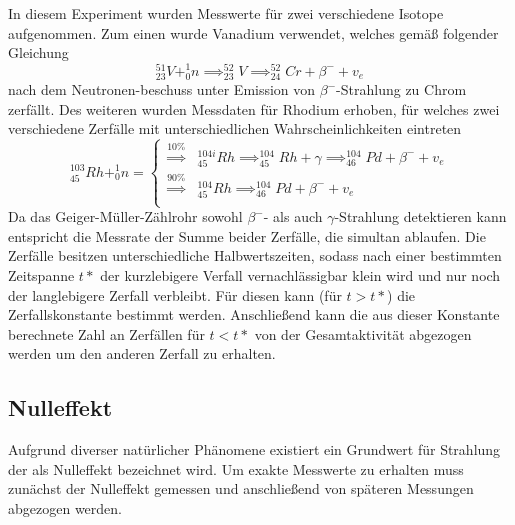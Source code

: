In diesem Experiment wurden Messwerte für zwei verschiedene Isotope aufgenommen. Zum einen wurde Vanadium 
verwendet, welches gemäß folgender Gleichung
\begin{equation}
^{51}_{23}V + ^1_0n \implies ^{52}_{23}V \implies ^{52}_{24}Cr + \beta^- + v_e
\end{equation}
nach dem Neutronen-beschuss unter Emission von $\beta^-$-Strahlung zu Chrom zerfällt. Des weiteren wurden 
Messdaten für Rhodium erhoben, für welches zwei verschiedene Zerfälle mit unterschiedlichen
 Wahrscheinlichkeiten eintreten
\begin{equation*}
^{103}_{45}Rh+^1_0n=
\begin{cases}
{\stackrel{10\%}{\implies}} &^{104i}_{45}Rh \implies ^{104}_{45}Rh+ \gamma \implies ^{104}_{46}Pd+\beta^-+v_e \\
{\stackrel{90\%}{\implies}} &^{104}_{45}Rh \implies ^{104}_{46}Pd+\beta^-+v_e \\
\end{cases}
\end{equation*}
Da das Geiger-Müller-Zählrohr sowohl $\beta^-$- als auch $\gamma$-Strahlung detektieren kann entspricht die
 Messrate der Summe beider Zerfälle, die simultan ablaufen. Die Zerfälle besitzen unterschiedliche 
 Halbwertszeiten, sodass nach einer bestimmten Zeitspanne $t*$ der kurzlebigere Verfall vernachlässigbar 
 klein wird und nur noch der langlebigere Zerfall verbleibt. Für diesen kann (für $t>t*$) die 
 Zerfallskonstante bestimmt werden. Anschließend kann die aus dieser Konstante berechnete Zahl an 
 Zerfällen für $t<t*$ von der Gesamtaktivität abgezogen werden um den anderen Zerfall zu erhalten.
\subsection{Nulleffekt}
Aufgrund diverser natürlicher Phänomene existiert ein Grundwert für Strahlung der als Nulleffekt 
bezeichnet wird. Um exakte Messwerte zu erhalten muss zunächst der Nulleffekt gemessen und anschließend 
von späteren Messungen abgezogen werden.
